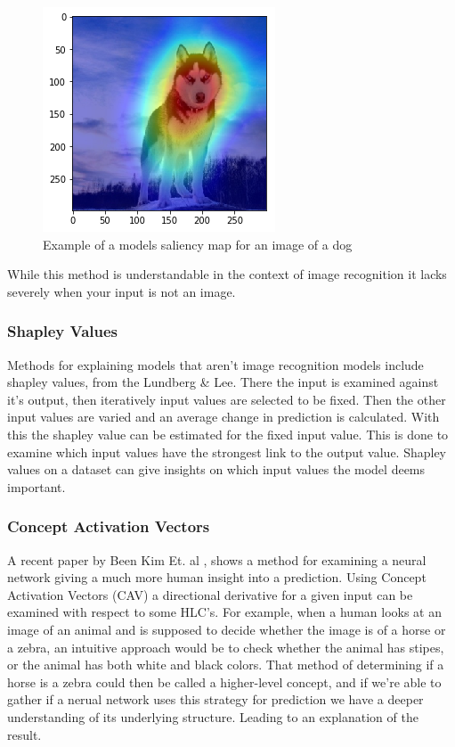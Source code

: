 \begin{figure}[]
  \centering
  \includegraphics[width=.5\textwidth]{graphics/dog_saliency}
  \caption{Example of a models saliency map for an image of a dog}
  \label{fig:dog_saliency}
\end{figure}

While this method is understandable in the context of image recognition it
lacks severely when your input is not an image.

\subsubsection{Shapley Values}

Methods for explaining models that aren't image recognition models include
shapley values, from the Lundberg \& Lee\cite{LundbergL:shapley}. There the input is examined against it's output, then iteratively
input values are selected to be fixed. Then the other input values are varied and
an average change in prediction is calculated. With this the shapley value can be
estimated for the fixed input value. This is done to examine which input values have
the strongest link to the output value. Shapley values on a dataset can give insights
on which input values the model deems important.

\subsubsection{Concept Activation Vectors}

A recent paper by Been Kim Et. al \cite{Keem:TCAV}, shows a method for examining
a neural network giving a much more human insight into a prediction. Using Concept
Activation Vectors (CAV) a directional derivative for a given input can be examined
with respect to some HLC's. For example, when a human looks at an image of an animal
and is supposed to decide whether the image is of a horse or a zebra, an intuitive
approach would be to check whether the animal has stipes, or the animal has both white and black colors.
That method of determining if a horse is a zebra could then be called a higher-level
concept, and if we're able to gather if a nerual network uses this strategy for prediction
we have a deeper understanding of its underlying structure. Leading to an explanation of
the result.

